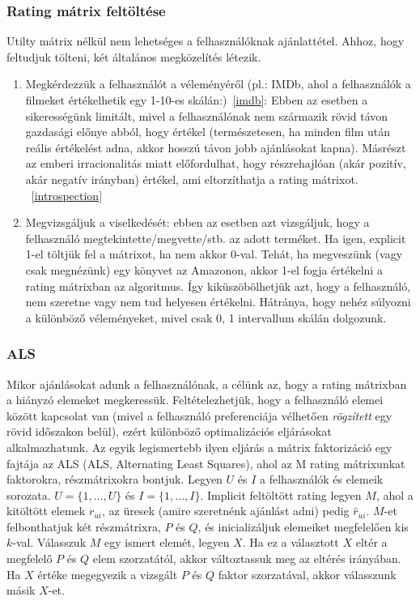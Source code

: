 \documentclass[a4paper,12pt]{article}
\begin{document}
\subsubsection{Rating mátrix feltöltése}
Utilty mátrix nélkül nem lehetséges a felhasználóknak ajánlattétel. Ahhoz, hogy feltudjuk tölteni, két általános megközelítés létezik.
\begin{enumerate}
\item Megkérdezzük a felhasználót a véleményéről (pl.: IMDb, ahol a felhasználók a filmeket értékelhetik egy 1-10-es skálán:)~\ref{imdb}: Ebben az esetben a sikerességünk limitált, mivel a felhasználónak nem származik rövid távon gazdasági előnye abból, hogy értékel (természetesen, ha minden film után reális értékelést adna, akkor hosszú távon jobb ajánlásokat kapna). Másrészt az emberi irracionalitás miatt előfordulhat, hogy részrehajlóan (akár pozitív, akár negatív irányban) értékel, ami eltorzíthatja a rating mátrixot. ~\ref{introspection}
\item Megvizsgáljuk a viselkedését: ebben az esetben azt vizsgáljuk, hogy a felhasználó megtekintette/megvette/stb. az adott terméket. Ha igen, explicit 1-el töltjük fel a mátrixot, ha nem akkor 0-val. Tehát, ha megveszünk (vagy csak megnézünk) egy könyvet az Amazonon, akkor 1-el fogja értékelni a rating mátrixban az algoritmus. Így kiküszöbölhetjük azt, hogy a felhasználó, nem szeretne vagy nem tud helyesen értékelni. Hátránya, hogy nehéz súlyozni a különböző véleményeket, mivel csak {0, 1} intervallum skálán dolgozunk.
\end{enumerate}

\subsubsection{ALS}
Mikor ajánlásokat adunk a felhasználónak, a célünk az, hogy a rating mátrixban a hiányzó elemeket megkeressük. Feltételezhetjük, hogy a felhasználó elemei között kapcsolat van (mivel a felhasználó preferenciája vélhetően \textsl{rögzített} egy rövid időszakon belül), ezért különböző optimalizációs eljárásokat alkalmazhatunk. Az egyik legismertebb ilyen eljárás a mátrix faktorizáció egy fajtája az ALS (ALS, Alternating Least Squares), ahol az M rating mátrixunkat faktorokra, részmátrixokra bontjuk. \linebreak
Legyen $U$ és $I$ a felhasználók és elemeik sorozata. $U={\{1, ..., U\}}$ és $I={\{1, ..., I\}}$.  Implicit feltöltött rating legyen $M$, ahol a kitöltött elemek $r_{ui}$, az üresek (amire szeretnénk ajánlást adni) pedig $\hat{r}_{ui}$. $M$-et felbonthatjuk két részmátrixra, $P$ és $Q$, és inicializáljuk elemeiket megfelelően kis $k$-val. Válasszuk $M$ egy ismert elemét, legyen $X$. Ha ez a választott $X$ eltér a megfelelő $P$ és $Q$ elem szorzatától, akkor változtassuk meg az eltérés irányában. Ha $X$ értéke megegyezik a vizsgált $P$ és $Q$ faktor szorzatával, akkor válasszunk másik $X$-et.
\end{document}
